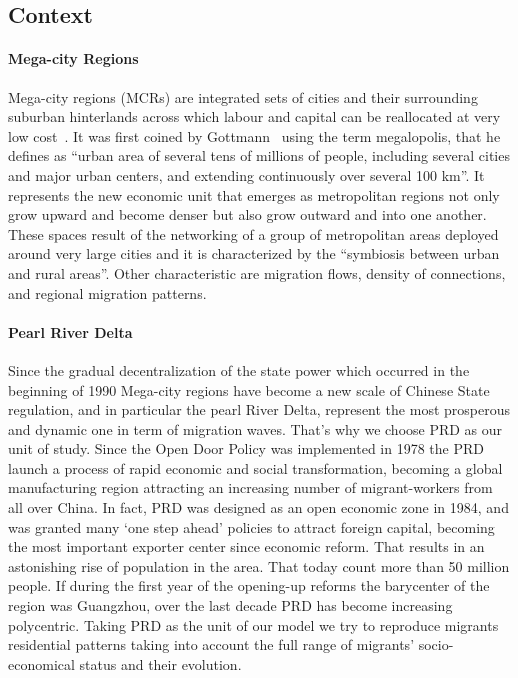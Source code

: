 \subsection{Context}

\paragraph{Mega-city Regions}

Mega-city regions (MCRs) are integrated sets of cities and their surrounding suburban hinterlands across which labour and capital can be reallocated at very low cost~\cite{florida2008rise}. It was first coined by Gottmann~\cite{gottman1961megalopolis} using the term megalopolis, that he defines as “urban area of several tens of millions of people, including several cities and major urban centers, and extending continuously over several 100 km”. It represents the new economic unit that emerges as metropolitan regions not only grow upward and become denser but also grow outward and into one another. These spaces result of the networking of a group of metropolitan areas deployed around very large cities and it is characterized by the “symbiosis between urban and rural areas”. Other characteristic are migration flows, density of connections, and regional migration patterns. 



\paragraph{Pearl River Delta}

Since the gradual decentralization of the state power which occurred in the beginning of  1990 Mega-city regions have become a new scale of Chinese State regulation, and in particular the pearl River Delta, represent the most prosperous and dynamic one in term of migration waves. That’s why we choose PRD as our unit of study. Since the Open Door Policy was implemented in 1978 the PRD launch a process of rapid economic and social transformation, becoming a global manufacturing region attracting an increasing number of migrant-workers from all over China. In fact, PRD was designed as an open economic zone in 1984, and was granted many ‘one step ahead’ policies to attract foreign capital, becoming the most important exporter center since economic reform. That results in an astonishing rise of population in the area. That today count more than 50 million people. If during the first year of the opening-up reforms the barycenter of the region was Guangzhou, over the last decade PRD has become increasing polycentric.
Taking PRD as the unit of our model we try to reproduce migrants residential patterns taking into account the full range of migrants’ socio-economical status and their evolution. 



